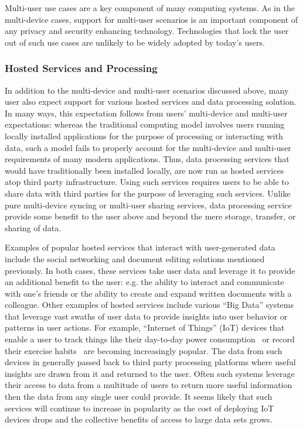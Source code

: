 Multi-user use cases are a key component of many computing systems. As
in the multi-device cases, support for multi-user scenarios is an
important component of any privacy and security enhancing
technology. Technologies that lock the user out of such use cases are
unlikely to be widely adopted by today's users.

\subsubsection{Hosted Services and Processing}

In addition to the multi-device and multi-user scenarios discussed
above, many user also expect support for various hosted services and
data processing solution. In many ways, this expectation follows from
users' multi-device and multi-user expectations: whereas the
traditional computing model involves users running locally installed
applications for the purpose of processing or interacting with data,
such a model fails to properly account for the multi-device and
multi-user requirements of many modern applications. Thus, data
processing services that would have traditionally been installed
locally, are now run as hosted services atop third party
infrastructure. Using such services requires users to be able to share
data with third parties for the purpose of leveraging such
services. Unlike pure multi-device syncing or multi-user sharing
services, data processing service provide some benefit to the user
above and beyond the mere storage, transfer, or sharing of data.

Examples of popular hosted services that interact with user-generated
data include the social networking and document editing solutions
mentioned previously. In both cases, these services take user data and
leverage it to provide an additional benefit to the user: e.g. the
ability to interact and communicate with one's friends or the ability
to create and expand written documents with a colleague. Other
examples of hosted services include various ``Big Data'' systems that
leverage vast swaths of user data to provide insights into user
behavior or patterns in user actions. For example, ``Internet of
Things'' (IoT) devices that enable a user to track things like their
day-to-day power consumption~\cite{neurio} or record their exercise
habits~\cite{fitbit} are becoming increasingly popular. The data from
such devices in generally passed back to third party processing
platforms where useful insights are drawn from it and returned to the
user. Often such systems leverage their access to data from a
multitude of users to return more useful information then the data
from any single user could provide. It seems likely that such services
will continue to increase in popularity as the cost of deploying IoT
devices drops and the collective benefits of access to large data sets
grows.

